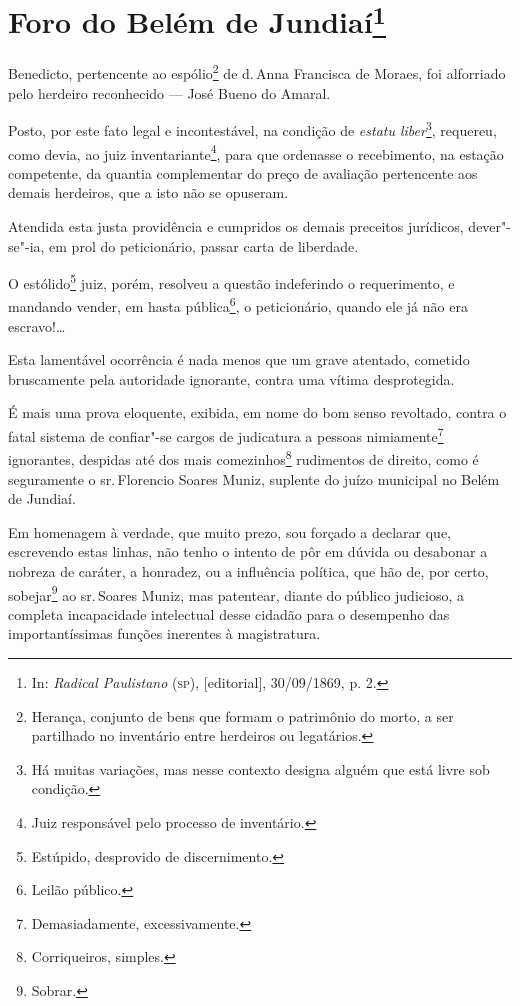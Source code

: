\chapter{Foro do Belém de Jundiaí\footnote[*]{In: \emph{Radical
  Paulistano} (\textsc{sp}), {[}editorial{]}, 30/09/1869, p. 2.}}



Benedicto, pertencente ao espólio\footnote{Herança, conjunto de bens
  que formam o patrimônio do morto, a ser partilhado no inventário entre
  herdeiros ou legatários.} de d.\,Anna Francisca de Moraes, foi
alforriado pelo herdeiro reconhecido --- José Bueno do Amaral.

Posto, por este fato legal e incontestável, na condição de \emph{estatu
liber}\footnote{Há muitas variações, mas nesse contexto designa alguém
  que está livre sob condição.}, requereu, como devia, ao juiz
inventariante\footnote{Juiz responsável pelo processo de inventário.},
para que ordenasse o recebimento, na estação competente, da quantia
complementar do preço de avaliação pertencente aos demais herdeiros, que
a isto não se opuseram.

Atendida esta justa providência e cumpridos os demais preceitos
jurídicos, dever"-se"-ia, em prol do peticionário, passar carta de
liberdade.

O estólido\footnote{Estúpido, desprovido de discernimento.} juiz,
porém, resolveu a questão indeferindo o requerimento, e mandando vender,
em hasta pública\footnote{Leilão público.}, o peticionário, quando ele
já não era escravo!\ldots{}

Esta lamentável ocorrência é nada menos que um grave atentado, cometido
bruscamente pela autoridade ignorante, contra uma vítima desprotegida.

É mais uma prova eloquente, exibida, em nome do bom senso revoltado,
contra o fatal sistema de confiar"-se cargos de judicatura a pessoas
nimiamente\footnote{Demasiadamente, excessivamente.} ignorantes,
despidas até dos mais comezinhos\footnote{Corriqueiros, simples.}
rudimentos de direito, como é seguramente o sr.\,Florencio Soares Muniz,
suplente do juízo municipal no Belém de Jundiaí.

Em homenagem à verdade, que muito prezo, sou forçado a declarar que,
escrevendo estas linhas, não tenho o intento de pôr em dúvida ou
desabonar a nobreza de caráter, a honradez, ou a influência política,
que hão de, por certo, sobejar\footnote{Sobrar.} ao sr.\,Soares Muniz,
mas patentear, diante do público judicioso, a completa incapacidade
intelectual desse cidadão para o desempenho das importantíssimas funções
inerentes à magistratura.

